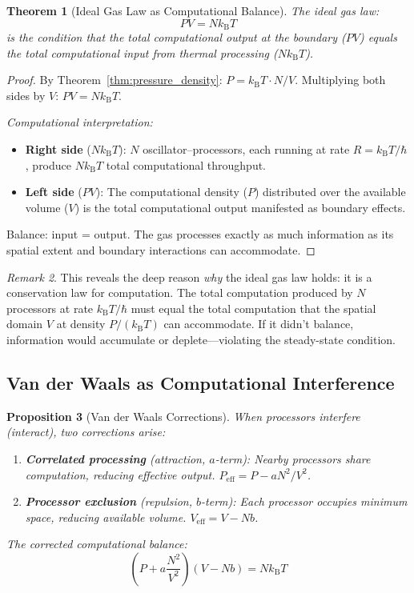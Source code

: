 \documentclass[twocolumn,10pt,a4paper]{article}
\theoremstyle{plain}
\newtheorem{theorem}{Theorem}[section]
\newtheorem{proposition}[theorem]{Proposition}
\theoremstyle{definition}
\theoremstyle{remark}
\newtheorem{remark}[theorem]{Remark}
\newcommand{\kB}{k_{\mathrm{B}}}
\begin{document}
\begin{theorem}[Ideal Gas Law as Computational Balance]
\label{thm:gas_computation}
The ideal gas law:
\begin{equation}
\boxed{PV = N\kB T}
\end{equation}
is the condition that the total computational output at the boundary ($PV$) equals the total computational input from thermal processing ($N\kB T$).
\end{theorem}

\begin{proof}
By Theorem~\ref{thm:pressure_density}: $P = \kB T \cdot N/V$. Multiplying both sides by $V$: $PV = N\kB T$.

\emph{Computational interpretation:}
\begin{itemize}
    \item \textbf{Right side} ($N\kB T$): $N$ oscillator--processors, each running at rate $R = \kB T/\hbar$, produce $N\kB T$ total computational throughput.
    \item \textbf{Left side} ($PV$): The computational density ($P$) distributed over the available volume ($V$) is the total computational output manifested as boundary effects.
\end{itemize}
Balance: input = output. The gas processes exactly as much information as its spatial extent and boundary interactions can accommodate.
\end{proof}

\begin{remark}
This reveals the deep reason \emph{why} the ideal gas law holds: it is a conservation law for computation. The total computation produced by $N$ processors at rate $\kB T/\hbar$ must equal the total computation that the spatial domain $V$ at density $P/(\kB T)$ can accommodate. If it didn't balance, information would accumulate or deplete---violating the steady-state condition.
\end{remark}

\subsection{Van der Waals as Computational Interference}

\begin{proposition}[Van der Waals Corrections]
\label{prop:vdw}
When processors interfere (interact), two corrections arise:
\begin{enumerate}
    \item \textbf{Correlated processing} (attraction, $a$-term): Nearby processors share computation, reducing effective output. $P_{\mathrm{eff}} = P - aN^2/V^2$.
    \item \textbf{Processor exclusion} (repulsion, $b$-term): Each processor occupies minimum space, reducing available volume. $V_{\mathrm{eff}} = V - Nb$.
\end{enumerate}
The corrected computational balance:
\begin{equation}
    \left(P + a\frac{N^2}{V^2}\right)(V - Nb) = N\kB T
\end{equation}
\end{proposition}
\end{document}
